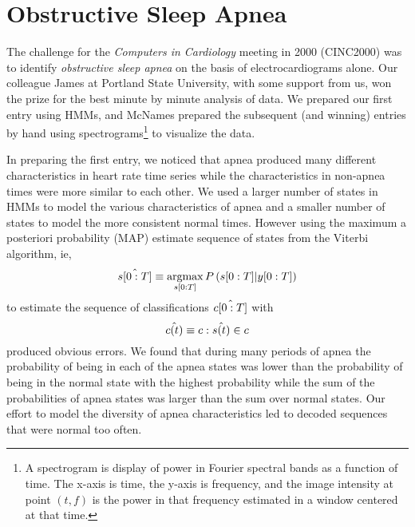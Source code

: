 
\chapter{Obstructive Sleep Apnea}
\label{chap:apnea}

The challenge for the \emph{Computers in Cardiology} %
%
meeting in 2000 (CINC2000) %
%
was to identify \emph{obstructive sleep apnea} on the basis of
electrocardiograms alone.  Our colleague James  at
Portland State University, with some support from us, won the prize
for the best minute by minute analysis of data.  We prepared our first
entry using HMMs, and McNames prepared the subsequent (and winning)
entries by hand using spectrograms\footnote{A spectrogram is display
  of power in Fourier spectral bands as a function of time.  The
  x-axis is time, the y-axis is frequency, and the image intensity at
  point $(t,f)$ is the power in that frequency estimated in a window
  centered at that time.} to visualize the data.  

In preparing the first entry, we noticed that apnea produced many
different characteristics in heart rate time series while the
characteristics in non-apnea times were more similar to each other.  We
used a larger number of states in HMMs to model the various
characteristics of apnea and a smaller number of states to model the
more consistent normal times.  However using the maximum a posteriori
probability (MAP) estimate sequence of states from the Viterbi
algorithm, ie,
\begin{equation*}
  \hat {s[0:T]} \equiv
  \operatorname*{argmax}_{s[0:T]}P\left(s[0:T] | y[0:T] \right)
\end{equation*}
to estimate the sequence of classifications $\hat {c[0:T]}$ with
\begin{equation*}
  \hat {{c}{(t)}} \equiv c:\hat {{s}{(t)}} \in c
\end{equation*}
produced obvious errors.  We found that during many periods of apnea
the probability of being in each of the apnea states was lower than
the probability of being in the normal state with the highest
probability while the sum of the probabilities of apnea states was
larger than the sum over normal states.  Our effort to model the
diversity of apnea characteristics led to decoded sequences that were
normal too often.

